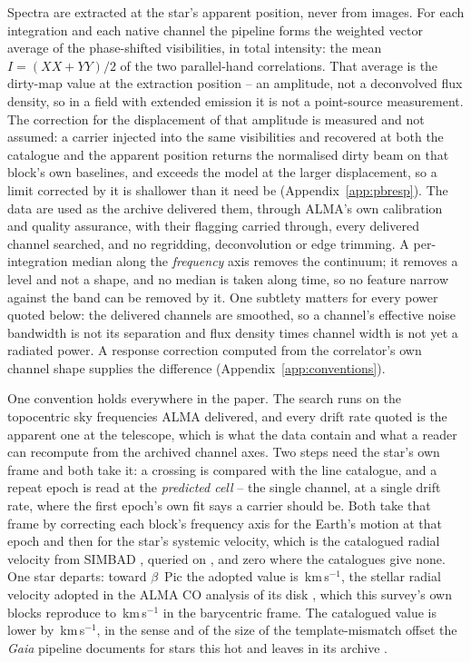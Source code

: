 Spectra are extracted at the star's apparent position, never from images.
For each integration and each native channel the pipeline forms the weighted
vector average of the phase-shifted visibilities, in total intensity: the
mean $I=(XX+YY)/2$ of the two parallel-hand correlations. That average is the
dirty-map value at the extraction position -- an amplitude, not a
deconvolved flux density, so in a field with extended emission it is not a
point-source measurement. The correction for the displacement of that
amplitude is measured and not assumed: a carrier injected into the same
visibilities and recovered at both the catalogue and the apparent position
returns the normalised dirty beam on that block's own baselines, and exceeds
the model at the larger displacement, so a limit corrected by it is
shallower than it need be (Appendix~\ref{app:pbresp}).
The data are used as the archive delivered them,
through ALMA's own calibration and quality assurance, with their flagging
carried through, every delivered channel searched, and no regridding,
deconvolution or edge trimming. A per-integration median along the
\emph{frequency} axis removes the continuum; it removes a level and not a
shape, and no median is taken along time, so no feature narrow against the
band can be removed by it. One
subtlety matters for every power quoted below: the delivered channels are
smoothed, so a channel's effective noise bandwidth is not its separation
and flux density times channel width is not yet a radiated power. A
response correction computed from the correlator's own channel shape
supplies the difference (Appendix~\ref{app:conventions}).

One convention holds everywhere in the paper. The search runs on the
topocentric sky frequencies ALMA delivered, and every drift rate quoted is
the apparent one at the telescope, which is what the data contain and what
a reader can recompute from the archived channel axes. Two steps need the
star's own frame and both take it: a crossing is compared with the line catalogue, and a repeat epoch is read
at the \emph{predicted cell} -- the single channel, at a single drift rate,
where the first epoch's own fit says a carrier should be. Both take that
frame by correcting each block's frequency axis for the Earth's motion at
that epoch and then for the star's systemic velocity, which is the
catalogued radial velocity from SIMBAD \citep{SIMBAD2000}, queried on
\SimbadQueryDate, and zero where the
catalogues give none. One star departs: toward $\beta$~Pic the adopted value
is \BpRecVsys\,km\,s$^{-1}$, the stellar radial velocity adopted in the ALMA
CO analysis of its disk \citep{Matra2017}, which this survey's own blocks
reproduce to \BpRecVsysSpread\,km\,s$^{-1}$ in the barycentric frame. The
catalogued value is lower by \BpRecVsysGaiaDiff\,km\,s$^{-1}$, in the sense
and of the size of the template-mismatch offset the \textit{Gaia} pipeline
documents for stars this hot and leaves in its archive \citep{Blomme2023}.

